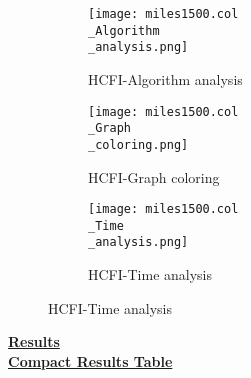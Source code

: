\documentclass[10pt]{article}
\begin{document}
\graphicspath{{./Core1/Solutions/HCFI/miles1500.col}}
\begin{figure}[H]
\begin{subfigure}{.33\textwidth}
  \centering
  \texttt{[image: miles1500.col\\\_Algorithm\\\_analysis.png]}
  \caption{HCFI-Algorithm analysis}
   \label{fig:subfig1}
\end{subfigure}%
\begin{subfigure}{.33\textwidth}
  \centering
  \texttt{[image: miles1500.col\\\_Graph\\\_coloring.png]}
  \caption{HCFI-Graph coloring}
  \label{fig:subfig2}
\end{subfigure}
\begin{subfigure}{.33\textwidth}
  \centering
  \texttt{[image: miles1500.col\\\_Time\\\_analysis.png]}
  \caption{HCFI-Time analysis}
  \end{subfigure}
\end{figure}
\vspace{2cm}
\begin{center}
\hyperlink{page.8}{\textbf{Results}}\\
\vspace{0.5cm}
\hyperlink{page.71}{\textbf{Compact Results Table}}
\end{center}
\pagebreak
\end{document}
